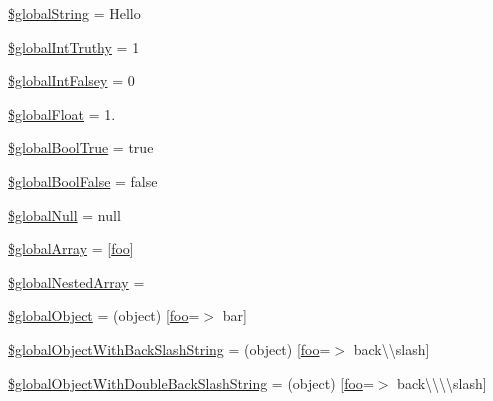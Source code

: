 \begin{DoxyCompactItemize}
\item 
\mbox{\hyperlink{bootstrap1335_8php_a7789daa8ef5c8aaab7ddbeca0b437ec2}{\$global\+String}} = \textquotesingle{}Hello\textquotesingle{}
\item 
\mbox{\hyperlink{bootstrap1335_8php_acfb98ba6ca4a7e2e020ca42f7a4825aa}{\$global\+Int\+Truthy}} = 1
\item 
\mbox{\hyperlink{bootstrap1335_8php_adaf43d21a6d8db11f26fd069149d364c}{\$global\+Int\+Falsey}} = 0
\item 
\mbox{\hyperlink{bootstrap1335_8php_a7bbca9b7c36c60f44d26c826c9aaa451}{\$global\+Float}} = 1.
\item 
\mbox{\hyperlink{bootstrap1335_8php_aba3efb1b9f2ab94fcf73921c9f317c27}{\$global\+Bool\+True}} = true
\item 
\mbox{\hyperlink{bootstrap1335_8php_aafdd89e19f276ca7c91d499896df5b4d}{\$global\+Bool\+False}} = false
\item 
\mbox{\hyperlink{bootstrap1335_8php_aaabf81b2dc11a776606f0642b87dad48}{\$global\+Null}} = null
\item 
\mbox{\hyperlink{bootstrap1335_8php_ac15952f1654749e4debcbadb1976aac7}{\$global\+Array}} = \mbox{[}\textquotesingle{}\mbox{\hyperlink{interfacefoo}{foo}}\textquotesingle{}\mbox{]}
\item 
\mbox{\hyperlink{bootstrap1335_8php_a67a456104aa71ae44a1c502409dc3ae0}{\$global\+Nested\+Array}} =
\item 
\mbox{\hyperlink{bootstrap1335_8php_a86fff2cf35cd706442d7f9fded17850a}{\$global\+Object}} = (object) \mbox{[}\textquotesingle{}\mbox{\hyperlink{interfacefoo}{foo}}\textquotesingle{}=$>$ \textquotesingle{}bar\textquotesingle{}\mbox{]}
\item 
\mbox{\hyperlink{bootstrap1335_8php_af9a9d1cd4a4da3b085df34b9e4e3a60b}{\$global\+Object\+With\+Back\+Slash\+String}} = (object) \mbox{[}\textquotesingle{}\mbox{\hyperlink{interfacefoo}{foo}}\textquotesingle{}=$>$ \textquotesingle{}back\textbackslash{}\textbackslash{}slash\textquotesingle{}\mbox{]}
\item 
\mbox{\hyperlink{bootstrap1335_8php_ac5dffa728e1521c66fbbb403b9ba5b4f}{\$global\+Object\+With\+Double\+Back\+Slash\+String}} = (object) \mbox{[}\textquotesingle{}\mbox{\hyperlink{interfacefoo}{foo}}\textquotesingle{}=$>$ \textquotesingle{}back\textbackslash{}\textbackslash{}\textbackslash{}\textbackslash{}slash\textquotesingle{}\mbox{]}
\end{DoxyCompactItemize}


